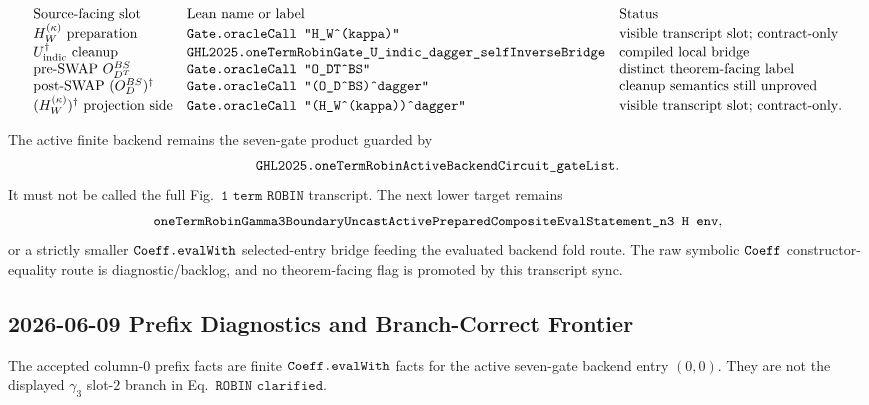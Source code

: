 \[
\begin{array}{lll}
\text{Source-facing slot} & \text{Lean name or label} & \text{Status}\\
H_W^{(\kappa)}\ \text{preparation} &
\texttt{Gate.oracleCall\ "H\_W\^{}(kappa)"} &
\text{visible transcript slot; contract-only}\\
U_{\mathrm{indic}}^\dagger\ \text{cleanup} &
\texttt{GHL2025.oneTermRobinGate\_U\_indic\_dagger\_selfInverseBridge} &
\text{compiled local bridge}\\
\text{pre-SWAP }O_{D^T}^{BS} &
\texttt{Gate.oracleCall\ "O\_DT\^{}BS"} &
\text{distinct theorem-facing label}\\
\text{post-SWAP }(O_D^{BS})^\dagger &
\texttt{Gate.oracleCall\ "(O\_D\^{}BS)\^{}dagger"} &
\text{cleanup semantics still unproved}\\
(H_W^{(\kappa)})^\dagger\ \text{projection side} &
\texttt{Gate.oracleCall\ "(H\_W\^{}(kappa))\^{}dagger"} &
\text{visible transcript slot; contract-only}.
\end{array}
\]

The active finite backend remains the seven-gate product guarded by
\[
  \texttt{GHL2025.oneTermRobinActiveBackendCircuit\_gateList}.
\]
It must not be called the full Fig.~\(\texttt{1 term ROBIN}\) transcript.
The next lower target remains
\[
  \Lean{oneTermRobinGamma3BoundaryUncastActivePreparedCompositeEvalStatement\_n3\ H\ env},
\]
or a strictly smaller \(\texttt{Coeff.evalWith}\) selected-entry bridge feeding
the evaluated backend fold route.  The raw symbolic \(\texttt{Coeff}\)
constructor-equality route is diagnostic/backlog, and no theorem-facing flag is
promoted by this transcript sync.

\subsection{2026-06-09 Prefix Diagnostics and Branch-Correct Frontier}

The accepted column-\(0\) prefix facts are finite
\(\texttt{Coeff.evalWith}\) facts for the active seven-gate backend entry
\((0,0)\).  They are not the displayed \(\gamma_3\) slot-\(2\) branch in
Eq.~\(\texttt{ROBIN clarified}\).

